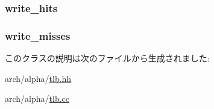 \label{classAlphaISA_1_1TLB_a764f5ef97bfcb1ba3ad05704de5a3a32}
\hypertarget{classAlphaISA_1_1TLB_ab3172bfd014e75dcad1b0a2a91de59dd}{
\subsubsection[{write\_\-hits}]{ {\bf write\_\-hits}}}
\label{classAlphaISA_1_1TLB_ab3172bfd014e75dcad1b0a2a91de59dd}
\hypertarget{classAlphaISA_1_1TLB_af8519a07f8f1f76c8fff9c9a1aaa4638}{
\subsubsection[{write\_\-misses}]{ {\bf write\_\-misses}}}
\label{classAlphaISA_1_1TLB_af8519a07f8f1f76c8fff9c9a1aaa4638}


このクラスの説明は次のファイルから生成されました:\begin{DoxyCompactItemize}
\item 
arch/alpha/\hyperlink{arch_2alpha_2tlb_8hh}{tlb.hh}\item 
arch/alpha/\hyperlink{arch_2alpha_2tlb_8cc}{tlb.cc}\end{DoxyCompactItemize}
